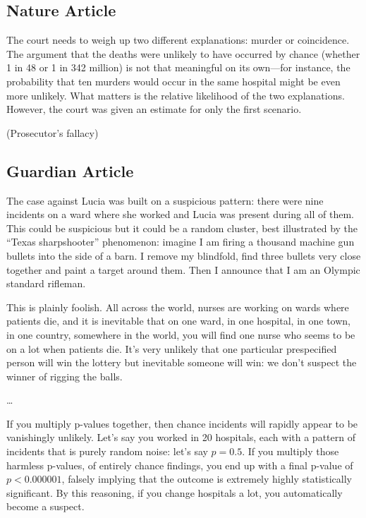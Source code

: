 \documentclass[letterpaper, landscape]{exam}
\begin{document}
  \subsection{Nature Article} %
  
  The court needs to weigh up two different explanations: murder or
  coincidence. The argument that the deaths were unlikely to have occurred by
  chance (whether 1 in 48 or 1 in 342 million) is not that meaningful on its
  own---for instance, the probability that ten murders would occur in the same
  hospital might be even more unlikely. What matters is the relative
  likelihood of the two explanations. However, the court was given an estimate
  for only the first scenario.

  (Prosecutor's fallacy)

  \subsection{Guardian Article} %

  The case against Lucia was built on a suspicious pattern: there were nine
  incidents on a ward where she worked and Lucia was present during all of them.
  This could be suspicious but it could be a random cluster, best illustrated by
  the ``Texas sharpshooter'' phenomenon: imagine I am firing a thousand machine gun
  bullets into the side of a barn. I remove my blindfold, find three bullets
  very close together and paint a target around them. Then I announce that I am
  an Olympic standard rifleman.

  This is plainly foolish. All across the world, nurses are working on wards
  where patients die, and it is inevitable that on one ward, in one hospital, in
  one town, in one country, somewhere in the world, you will find one nurse who
  seems to be on a lot when patients die. It's very unlikely that one particular
  prespecified person will win the lottery but inevitable someone will win: we
  don't suspect the winner of rigging the balls.

  \dots

  If you multiply p-values together, then chance incidents will rapidly appear
  to be vanishingly unlikely. Let's say you worked in 20 hospitals, each with a
  pattern of incidents that is purely random noise: let's say $p = 0.5$. If you
  multiply those harmless p-values, of entirely chance findings, you end up with
  a final p-value of $p < 0.000001$, falsely implying that the outcome is
  extremely highly statistically significant. By this reasoning, if you change
  hospitals a lot, you automatically become a suspect.
\end{document}
